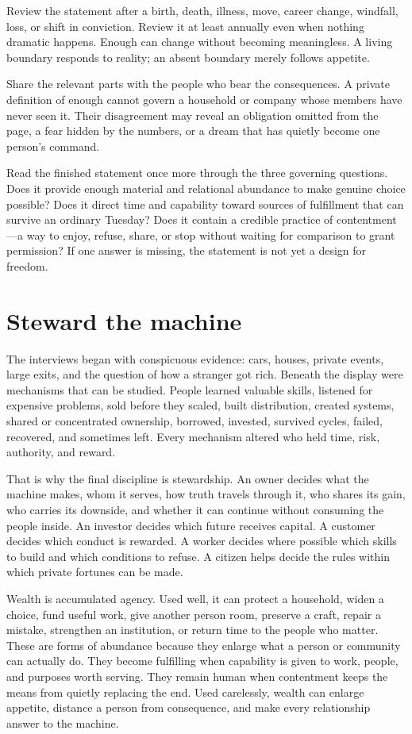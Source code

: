 Review the statement after a birth, death, illness, move, career change,
windfall, loss, or shift in conviction. Review it at least annually even when
nothing dramatic happens. Enough can change without becoming meaningless. A
living boundary responds to reality; an absent boundary merely follows
appetite.

Share the relevant parts with the people who bear the consequences. A private
definition of enough cannot govern a household or company whose members have
never seen it. Their disagreement may reveal an obligation omitted from the
page, a fear hidden by the numbers, or a dream that has quietly become one
person's command.

Read the finished statement once more through the three governing questions.
Does it provide enough material and relational abundance to make genuine
choice possible? Does it direct time and capability toward sources of
fulfillment that can survive an ordinary Tuesday? Does it contain a credible
practice of contentment---a way to enjoy, refuse, share, or stop without waiting
for comparison to grant permission? If one answer is missing, the statement is
not yet a design for freedom.

\section{Steward the machine}

The interviews began with conspicuous evidence: cars, houses, private events,
large exits, and the question of how a stranger got rich. Beneath the display
were mechanisms that can be studied. People learned valuable skills, listened
for expensive problems, sold before they scaled, built distribution, created
systems, shared or concentrated ownership, borrowed, invested, survived
cycles, failed, recovered, and sometimes left. Every mechanism altered who
held time, risk, authority, and reward.

That is why the final discipline is stewardship. An owner decides what the
machine makes, whom it serves, how truth travels through it, who shares its
gain, who carries its downside, and whether it can continue without consuming
the people inside. An investor decides which future receives capital. A
customer decides which conduct is rewarded. A worker decides where possible
which skills to build and which conditions to refuse. A citizen helps decide
the rules within which private fortunes can be made.

Wealth is accumulated agency. Used well, it can protect a household, widen a
choice, fund useful work, give another person room, preserve a craft, repair a
mistake, strengthen an institution, or return time to the people who matter.
These are forms of abundance because they enlarge what a person or community
can actually do. They become fulfilling when capability is given to work,
people, and purposes worth serving. They remain human when contentment keeps
the means from quietly replacing the end. Used carelessly, wealth can enlarge
appetite, distance a person from consequence, and make every relationship
answer to the machine.

